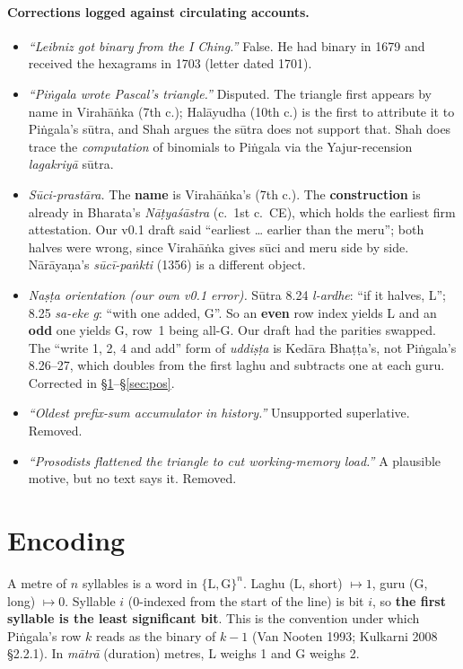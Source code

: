 \documentclass[11pt,letterpaper]{article}
\newcommand{\skt}[1]{\textit{#1}}
\theoremstyle{plain}
\theoremstyle{remark}
\begin{document}
\paragraph{Corrections logged against circulating accounts.}
\begin{itemize}
\item \emph{``Leibniz got binary from the I Ching.''} False. He had binary in 1679 and received the hexagrams in 1703 (letter dated 1701).
\item \emph{``Piṅgala wrote Pascal's triangle.''} Disputed. The triangle first appears by name in Virahāṅka (7th c.); Halāyudha (10th c.) is the first to attribute it to Piṅgala's sūtra, and Shah argues the sūtra does not support that. Shah does trace the \emph{computation} of binomials to Piṅgala via the Yajur-recension \skt{lagakriyā} sūtra.
\item \emph{Sūci-prastāra.} The \textbf{name} is Virahāṅka's (7th c.). The \textbf{construction} is already in Bharata's \skt{Nāṭyaśāstra} (c.\ 1st c.\ CE), which holds the earliest firm attestation. Our v0.1 draft said ``earliest \dots{} earlier than the meru''; both halves were wrong, since Virahāṅka gives sūci and meru side by side. Nārāyaṇa's \skt{sūcī-paṅkti} (1356) is a different object.
\item \emph{Naṣṭa orientation (our own v0.1 error).} Sūtra 8.24 \skt{l-ardhe}: ``if it halves, L''; 8.25 \skt{sa-eke g}: ``with one added, G''. So an \textbf{even} row index yields L and an \textbf{odd} one yields G, row~1 being all-G. Our draft had the parities swapped. The ``write 1, 2, 4 and add'' form of \skt{uddiṣṭa} is Kedāra Bhaṭṭa's, not Piṅgala's 8.26--27, which doubles from the first laghu and subtracts one at each guru. Corrected in §\ref{sec:enc}--§\ref{sec:pos}.
\item \emph{``Oldest prefix-sum accumulator in history.''} Unsupported superlative. Removed.
\item \emph{``Prosodists flattened the triangle to cut working-memory load.''} A plausible motive, but no text says it. Removed.
\end{itemize}

\section{Encoding}\label{sec:enc}

A metre of $n$ syllables is a word in $\{\mathrm{L},\mathrm{G}\}^n$. Laghu (L, short) $\mapsto 1$, guru (G, long) $\mapsto 0$. Syllable $i$ (0-indexed from the start of the line) is bit $i$, so \textbf{the first syllable is the least significant bit}. This is the convention under which Piṅgala's row $k$ reads as the binary of $k-1$ (Van Nooten 1993; Kulkarni 2008 §2.2.1). In \skt{mātrā} (duration) metres, L weighs 1 and G weighs 2.
\end{document}
